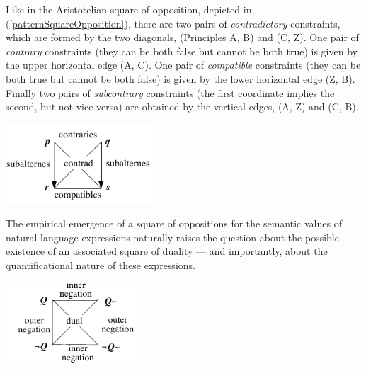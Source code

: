 \documentclass[output=paper
,modfonts
,nonflat]{langsci/langscibook}
\begin{document}

Like in the Aristotelian square of opposition, depicted in (\ref{patternSquareOpposition}), there are two pairs of \emph{contradictory} constraints, which are formed
by the two diagonals, (Principles A, B) and (C, Z). One pair of \emph{contrary}
constraints (they can be both false but cannot be both true) is given
by the upper horizontal edge (A, C).  One pair of \emph{compatible}
constraints (they can be both true but cannot be both false) is given
by the lower horizontal edge (Z, B). Finally two pairs of
\emph{subcontrary} constraints (the first coordinate implies the second,
but not vice-versa) are obtained by the vertical edges, (A, Z) and (C,
B).


\begin{exe}
\ex
\label{patternSquareOpposition}
\end{exe}
\vspace{-10mm}
\centerline{\includegraphics[width=13pc]{figures/patternSquareOpposition.pdf}}



The empirical
emergence of a square of oppositions for the semantic values of natural
language expressions naturally raises the question about the possible
existence of an associated square of duality --- and importantly,
about the quantificational nature of these expressions. 

\begin{exe}
\ex
\label{patternSquareDuality}
\end{exe}
\vspace{-7mm}
\centerline{\includegraphics[width=12pc]{figures/patternSquareDuality.pdf}}
\end{document}
